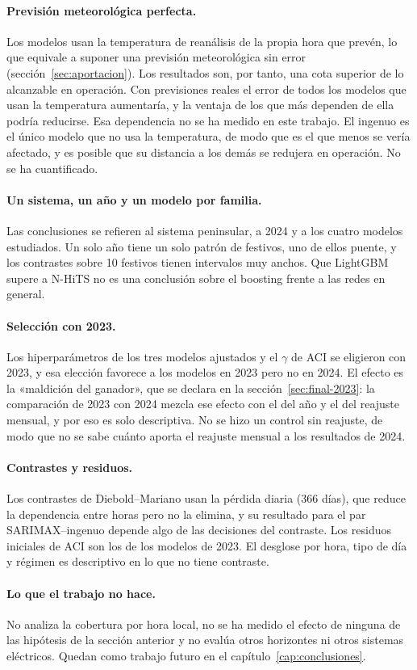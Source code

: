 \paragraph{Previsión meteorológica perfecta.} Los modelos usan la temperatura de
reanálisis de la propia hora que prevén, lo que equivale a suponer una previsión
meteorológica sin error (sección~\ref{sec:aportacion}). Los resultados son, por
tanto, una cota superior de lo alcanzable en operación. Con previsiones reales
el error de todos los modelos que usan la temperatura aumentaría, y la ventaja
de los que más dependen de ella podría reducirse. Esa dependencia
no se ha medido en este trabajo. El ingenuo es el único modelo que no usa la temperatura, de modo
que es el que menos se vería afectado, y es posible que su distancia a los
demás se redujera en operación. No se ha cuantificado.

\paragraph{Un sistema, un año y un modelo por familia.} Las conclusiones se
refieren al sistema peninsular, a 2024 y a los cuatro modelos estudiados. Un
solo año tiene un solo patrón de festivos, uno de ellos puente, y los
contrastes sobre 10 festivos tienen intervalos muy anchos. Que LightGBM supere a
N-HiTS no es una conclusión sobre el boosting frente a las redes en general.

\paragraph{Selección con 2023.} Los hiperparámetros de los tres modelos
ajustados y el $\gamma$ de ACI se eligieron con 2023, y esa elección favorece a
los modelos en 2023 pero no en 2024. El efecto es la «maldición del ganador»,
que se declara en la sección~\ref{sec:final-2023}: la comparación de 2023 con
2024 mezcla ese efecto con el del año y el del reajuste mensual, y por eso es
solo descriptiva. No se hizo un control sin reajuste, de modo que no se sabe
cuánto aporta el reajuste mensual a los resultados de 2024.

\paragraph{Contrastes y residuos.} Los contrastes de Diebold--Mariano usan la
pérdida diaria (366 días), que reduce la dependencia entre horas pero no la
elimina, y su resultado para el par SARIMAX--ingenuo depende algo de las
decisiones del contraste. Los residuos iniciales de ACI son los de los modelos
de 2023. El desglose por hora, tipo de día y régimen es descriptivo en lo que no
tiene contraste.

\paragraph{Lo que el trabajo no hace.} No analiza la cobertura por hora local, no
se ha medido el efecto de ninguna de las hipótesis de la sección anterior y no
evalúa otros horizontes ni otros sistemas eléctricos. Quedan como trabajo futuro
en el capítulo~\ref{cap:conclusiones}.
